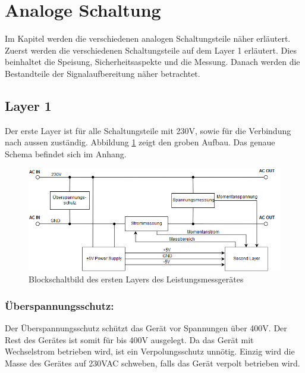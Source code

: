 
\section{Analoge Schaltung}\label{sec:analoge_schaltung}
Im Kapitel werden die verschiedenen analogen Schaltungsteile näher erläutert. Zuerst werden die verschiedenen Schaltungsteile auf dem Layer 1 erläutert. Dies beinhaltet die Speisung, Sicherheitsaspekte und die Messung. Danach werden die Bestandteile der Signalaufbereitung näher betrachtet.

\subsection{Layer 1}%
Der erste Layer ist für alle Schaltungsteile mit 230V, sowie für die Verbindung nach aussen zuständig. Abbildung \ref{fig:first_layer} zeigt den groben Aufbau. Das genaue Schema befindet sich im Anhang.

\begin{figure}[H]
\begin{center}
\includegraphics[width=160mm]{images/first_layer.png}

	\caption{Blockschaltbild des ersten Layers des Leistungsmessgerätes} %
	\label{fig:first_layer}
\end{center}
\end{figure}

\subsubsection*{Überspannungsschutz:}
Der Überspannungsschutz schützt das Gerät vor Spannungen über 400V. Der Rest des Gerätes ist somit für bis 400V ausgelegt. Da das Gerät mit Wechselstrom betrieben wird, ist ein Verpolungsschutz unnötig. Einzig wird die Masse des Gerätes auf 230VAC schweben, falls das Gerät verpolt betrieben wird.

